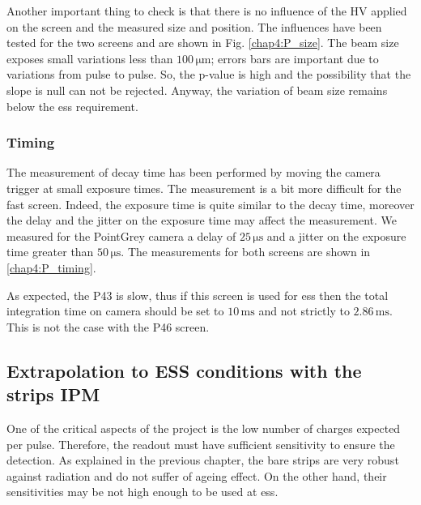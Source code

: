 \begin{refsection}
  

  Another important thing to check is that there is no influence of the HV applied on the screen and the measured size and position. The influences have been tested for the two screens and are shown in Fig. \ref{chap4:P_size}. The beam size exposes small variations less than $100\,\mathrm{\mu m}$; errors bars are important due to variations from pulse to pulse. So, the p-value is high and the possibility that the slope is null can not be rejected. Anyway, the variation of beam size remains below the \acrshort{ess} requirement.

  

  \subsubsection{Timing}
  The measurement of decay time has been performed by moving the camera trigger at small exposure times. The measurement is a bit more difficult for the fast screen. Indeed, the exposure time is quite similar to the decay time, moreover the delay and the jitter on the exposure time may affect the measurement.
  We measured for the PointGrey camera a delay of $25\,\mathrm{\mu s}$ and a jitter on the exposure time greater than $50\,\mathrm{\mu s}$. The measurements for both screens are shown in \ref{chap4:P_timing}.

  

  As expected, the P43 is slow, thus if this screen is used for \acrshort{ess} then the total integration time on camera should be set to $10\,\mathrm{ms}$ and not strictly to $2.86\,\mathrm{ms}$. This is not the case with the P46 screen.

  \subsection{Extrapolation to ESS conditions with the strips IPM}

  One of the critical aspects of the project is the low number of charges expected per pulse. Therefore, the  readout must have sufficient sensitivity to ensure the detection. As explained in the previous chapter, the bare strips are very robust against radiation and do not suffer of ageing effect. On the other hand, their sensitivities may be not high enough to be used at \acrshort{ess}.

  


\end{refsection}
